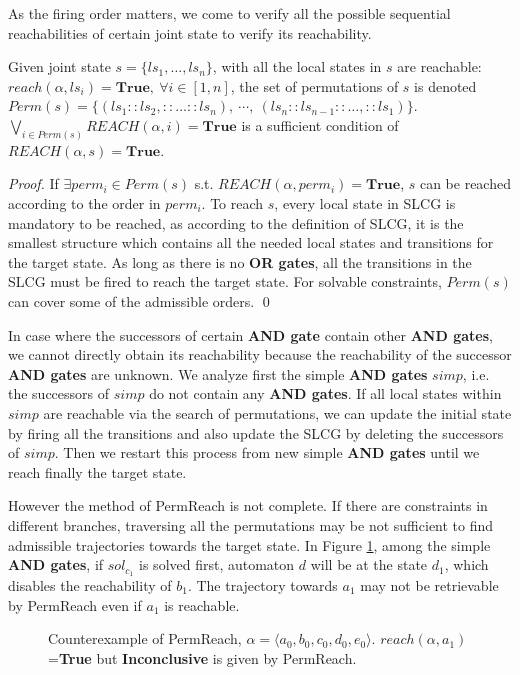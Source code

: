 As the firing order matters, we come to verify all the possible sequential reachabilities of certain joint state to verify its reachability.

\begin{proposition}\label{theoperm}
Given joint state $s=\{ls_1,\ldots,ls_n\}$, with all the local states in $s$ are reachable: $reach(\alpha,ls_i)=\mathbf{True},\ \forall i\in[1,n]$, the set of permutations of $s$ is denoted $Perm(s)=\{(ls_1::ls_2,::\ldots ::ls_n),\ \cdots,\ (ls_n::ls_{n-1}::\ldots,::ls_1)\}$. $\bigvee_{i\in Perm(s)} REACH(\alpha,i)=\mathbf{True}$ is a sufficient condition of $REACH(\alpha,s)=\mathbf{True}$.
\end{proposition}
\begin{proof}
If $\exists perm_i\in Perm(s)$ s.t. $REACH(\alpha,perm_i)=\mathbf{True}$, $s$ can be reached according to the order in $perm_i$.
To reach $s$, every local state in SLCG is mandatory to be reached, as according to the definition of SLCG, it is the smallest structure which contains all the needed local states and transitions for the target state. As long as there is no \textbf{OR gates}, all the transitions in the SLCG must be fired to reach the target state.
For solvable constraints, $Perm(s)$ can cover some of the admissible orders.
\qed\end{proof}

In case where the successors of certain \textbf{AND gate} contain other \textbf{AND gates}, we cannot directly obtain its reachability because the reachability of the successor \textbf{AND gates} are unknown.
We analyze first the simple \textbf{AND gates} $simp$, i.e. the successors of $simp$ do not contain any \textbf{AND gates}.
If all local states within $simp$ are reachable via the search of permutations, we can update the initial state by firing all the transitions and also update the SLCG by deleting the successors of $simp$. 
Then we restart this process from new simple \textbf{AND gates} until we reach finally the target state.

However the method of PermReach is not complete. 
If there are constraints in different branches, traversing all the permutations may be not sufficient to find admissible trajectories towards the target state.
In Figure \ref{FigConflictInForks}, among the simple \textbf{AND gates}, if $sol_{c_1}$ is solved first, automaton $d$ will be at the state $d_1$, which disables the reachability of $b_1$.
The trajectory towards $a_1$ may not be retrievable by PermReach even if $a_1$ is reachable.
\begin{figure}[ht]
\centering

\caption[Counterexample of PermReach]{Counterexample of PermReach, $\alpha=\langle a_0,b_0,c_0,d_0,e_0\rangle$. 
$reach(\alpha,a_1)$=\textbf{True} but \textbf{Inconclusive} is given by PermReach.
}\label{FigConflictInForks}
\end{figure}
